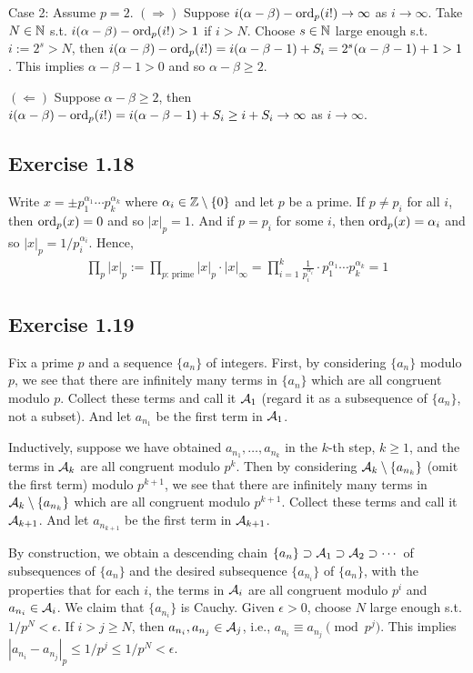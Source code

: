 \documentclass[../Koblitz.tex]{subfiles}
\begin{document}
Case 2: Assume $p=2$. $(\Rightarrow)$ Suppose $i(\alpha-\beta)-\operatorname{ord}_p(i!)\to\infty$ as $i\to\infty$. Take $N\in\mathbb{N}$ s.t. $i(\alpha-\beta)-\operatorname{ord}_p(i!) > 1$ if $i>N$. Choose $s\in\mathbb{N}$ large enough s.t. $i:=2^s>N$, then $i(\alpha-\beta)-\operatorname{ord}_p(i!) = i(\alpha-\beta-1)+S_i = 2^s(\alpha-\beta-1) +1 >1$. This implies $\alpha-\beta-1>0$ and so $\alpha-\beta\geq 2$.

$(\Leftarrow)$ Suppose $\alpha-\beta\geq 2$, then $i(\alpha-\beta)-\operatorname{ord}_p(i!) = i(\alpha-\beta-1)+S_i \geq i+S_i \to \infty$ as $i\to\infty$.

\subsection*{Exercise 1.18}

Write $x=\pm p_1^{\alpha_1}\cdots p_k^{\alpha_k}$ where $\alpha_i\in\mathbb{Z}\setminus\{0\}$ and let $p$ be a prime. If $p\neq p_i$ for all $i$, then $\operatorname{ord}_p(x)=0$ and so $|x|_p=1$. And if $p=p_i$ for some $i$, then $\operatorname{ord}_p(x)=\alpha_i$ and so $|x|_p=1/p_i^{\alpha_i}$. Hence,
\begin{align*}
    \prod_p |x|_p := \prod_{p\text{: prime}} |x|_p \cdot |x|_\infty = \prod_{i=1}^k \frac{1}{p_i^{\alpha_i}} \cdot p_1^{\alpha_1}\cdots p_k^{\alpha_k} = 1
\end{align*}

\subsection*{Exercise 1.19}

Fix a prime $p$ and a sequence $\{a_n\}$ of integers. First, by considering $\{a_n\}$ modulo $p$, we see that there are infinitely many terms in $\{a_n\}$ which are all congruent modulo $p$. Collect these terms and call it $\mathcal{A}_1$ (regard it as a subsequence of $\{a_n\}$, not a subset). And let $a_{n_1}$ be the first term in $\mathcal{A}_1$.

Inductively, suppose we have obtained $a_{n_1},\ldots,a_{n_k}$ in the $k$-th step, $k\geq1$, and the terms in $\mathcal{A}_k$ are all congruent modulo $p^k$. Then by considering $\mathcal{A}_k\setminus\{a_{n_k}\}$ (omit the first term) modulo $p^{k+1}$, we see that there are infinitely many terms in $\mathcal{A}_k\setminus\{a_{n_k}\}$ which are all congruent modulo $p^{k+1}$. Collect these terms and call it $\mathcal{A}_{k+1}$. And let $a_{n_{k+1}}$ be the first term in $\mathcal{A}_{k+1}$.

By construction, we obtain a descending chain $\{a_n\}\supset\mathcal{A}_1\supset\mathcal{A}_2\supset\cdots$ of subsequences of $\{a_n\}$ and the desired subsequence $\{a_{n_i}\}$ of $\{a_n\}$, with the properties that for each $i$, the terms in $\mathcal{A}_i$ are all congruent modulo $p^i$ and $a_{n_i}\in\mathcal{A}_i$. We claim that $\{a_{n_i}\}$ is Cauchy. Given $\epsilon>0$, choose $N$ large enough s.t. $1/p^N<\epsilon$. If $i>j\geq N$, then $a_{n_i},a_{n_j}\in\mathcal{A}_j$, i.e., $a_{n_i}\equiv a_{n_j} \pmod{p^j}$. This implies $|a_{n_i}-a_{n_j}|_p \leq 1/p^j \leq 1/p^N < \epsilon$.
\end{document}
